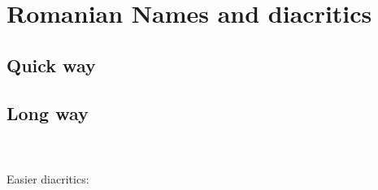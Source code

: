 \section{Romanian Names and diacritics}
\subsection[Quick way]{Quick way \noncurs}

\code{\usepackage[romanian]{babel}}

\subsection{Long way}
\begin{latex}
\renewcommand{\contentsname}{Cuprins}
\renewcommand{\chaptername}{Capitolul}

\renewcommand{\bibname}{B\lowercase{ibliografie}}
\renewcommand{\refname}{B\lowercase{ibliografie}} %

\renewcommand{\appendixname}{Anexa}
\renewcommand{\indexname}{I\lowercase{ndice}}
\renewcommand{\abstractname}{Rezumatul lucr\u{a}rii}
\renewcommand{\listtablename}{Lista de tabele}
\renewcommand{\listfigurename}{Lista de figuri}
\end{latex}


\\
\\
Easier diacritics:
\begin{latex}
\code{\usepackage[romanian]{babel}}
\end{latex}
